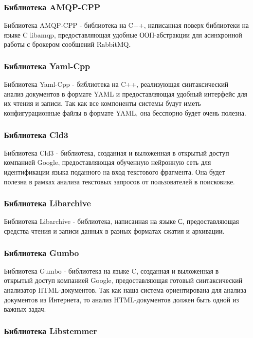 \subsubsection{Библиотека AMQP-CPP}

Библиотека AMQP-CPP - библиотека на C++, написанная поверх библиотеки на языке C libamqp, предоставляющая удобные ООП-абстракции для асинхронной работы с брокером сообщений RabbitMQ.

\subsubsection{Библиотека Yaml-Cpp}

Библиотека Yaml-Cpp - библиотека на C++, реализующая синтаксический анализ документов в формате YAML и предоставляющая удобный интерфейс для их чтения и записи. Так как все компоненты системы будут иметь конфигурационные файлы в формате YAML, она бесспорно будет очень полезна.

\subsubsection{Библиотека Cld3}

Библиотека Cld3 - библиотека, созданная и выложенная в открытый доступ компанией Google, предоставляющая обученную нейронную сеть для идентификации языка поданного на вход текстового фрагмента. Она будет полезна в рамках анализа текстовых запросов от пользователей в поисковике.

\subsubsection{Библиотека Libarchive}

Библиотека Libarchive - библиотека, написанная на языке С, предоставляющая средства чтения и записи данных в разных форматах сжатия и архивации.

\subsubsection{Библиотека Gumbo}

Библиотека Gumbo - библиотека на языке C, созданная и выложенная в открытый доступ компанией Google, предоставляющая готовый синтаксический анализатор HTML-документов. Так как наша система ориентирована для анализа документов из Интернета, то анализ HTML-документов должен быть одной из важных задач. 

\subsubsection{Библиотека Libstemmer}

